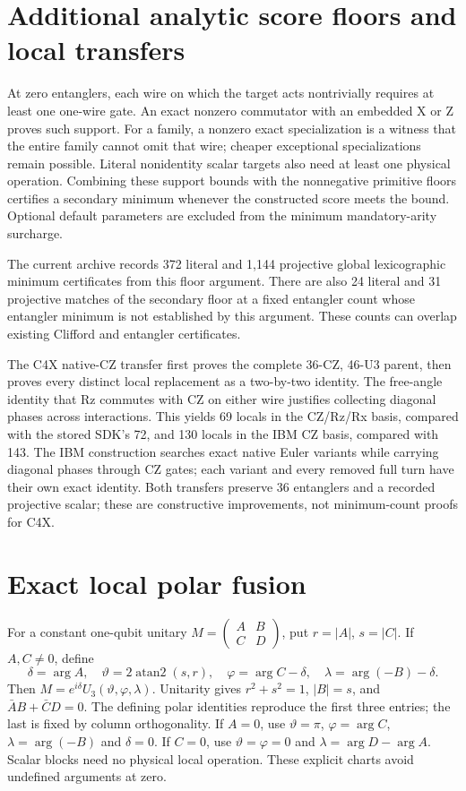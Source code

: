 \documentclass[11pt]{article}
\begin{document}
\section{Additional analytic score floors and local transfers}
At zero entanglers, each wire on which the target acts nontrivially requires
at least one one-wire gate. An exact nonzero commutator with an embedded X
or Z proves such support. For a family, a nonzero exact specialization is a
witness that the entire family cannot omit that wire; cheaper exceptional
specializations remain possible. Literal nonidentity scalar targets also need
at least one physical operation. Combining these support bounds with the
nonnegative primitive floors certifies a secondary minimum whenever the
constructed score meets the bound. Optional default parameters are excluded
from the minimum mandatory-arity surcharge.

The current archive records 372 literal and 1,144 projective global
lexicographic minimum certificates from this floor argument. There are also
24 literal and 31 projective matches of the secondary floor at a fixed
entangler count whose entangler minimum is not established by this argument.
These counts can overlap existing Clifford and entangler certificates.

The C4X native-CZ transfer first proves the complete 36-CZ, 46-U3 parent,
then proves every distinct local replacement as a two-by-two identity.
The free-angle identity that Rz commutes with CZ on either wire justifies
collecting diagonal phases across interactions. This yields 69 locals in
the CZ/Rz/Rx basis, compared with the stored SDK's 72, and 130 locals in the
IBM CZ basis, compared with 143. The IBM construction searches exact native
Euler variants while carrying diagonal phases through CZ gates; each variant
and every removed full turn have their own exact identity.
Both transfers preserve 36 entanglers and a recorded projective scalar;
these are constructive improvements, not minimum-count proofs for C4X.


\section{Exact local polar fusion}
For a constant one-qubit unitary $M=\left(\begin{smallmatrix}A&B\\C&D\end{smallmatrix}\right)$,
put $r=|A|$, $s=|C|$. If $A,C\ne0$, define
\[
 \delta=\arg A,\quad \vartheta=2\operatorname{atan2}(s,r),\quad
 \varphi=\arg C-\delta,\quad \lambda=\arg(-B)-\delta.
\]
Then $M=e^{i\delta}U_3(\vartheta,\varphi,\lambda)$. Unitarity gives
$r^2+s^2=1$, $|B|=s$, and $\bar A B+\bar C D=0$.
The defining polar identities reproduce the first three entries; the last
is fixed by column orthogonality. If $A=0$, use
$\vartheta=\pi$, $\varphi=\arg C$, $\lambda=\arg(-B)$ and $\delta=0$.
If $C=0$, use $\vartheta=\varphi=0$ and
$\lambda=\arg D-\arg A$. Scalar blocks need no physical local operation.
These explicit charts avoid undefined arguments at zero.
\end{document}
